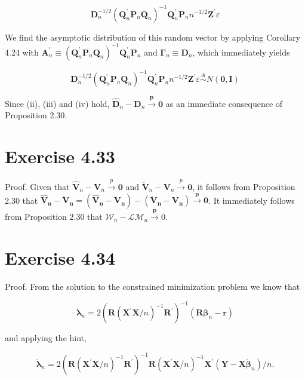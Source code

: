 \documentclass[10pt]{article}
\begin{document}
$$
\mathbf{D}_{n}^{-1 / 2}\left(\mathbf{Q}_{n}^{\prime} \mathbf{P}_{n} \mathbf{Q}_{n}\right)^{-1} \mathbf{Q}_{n}^{\prime} \mathbf{P}_{n} n^{-1 / 2} \mathbf{Z}^{\prime} \varepsilon
$$

We find the asymptotic distribution of this random vector by applying Corollary 4.24 with $\mathbf{A}_{n}^{\prime} \equiv\left(\mathbf{Q}_{n}^{\prime} \mathbf{P}_{n} \mathbf{Q}_{n}\right)^{-1} \mathbf{Q}_{n}^{\prime} \mathbf{P}_{n}$ and $\boldsymbol{\Gamma}_{n} \equiv \mathbf{D}_{n}$, which immediately yields

$$
\mathbf{D}_{n}^{-1 / 2}\left(\mathbf{Q}_{n}^{\prime} \mathbf{P}_{n} \mathbf{Q}_{n}\right)^{-1} \mathbf{Q}_{n}^{\prime} \mathbf{P}_{n} n^{-1 / 2} \mathbf{Z}^{\prime} \varepsilon \stackrel{A}{\sim} N(\mathbf{0}, \mathbf{I})
$$

Since (ii), (iii) and (iv) hold, $\hat{\mathbf{D}}_{n}-\mathbf{D}_{n} \xrightarrow{\boldsymbol{p}} \mathbf{0}$ as an immediate consequence of Proposition 2.30.

\section*{Exercise 4.33}
Proof. Given that $\hat{\mathbf{V}}_{n}-\mathbf{V}_{n} \xrightarrow{p} \mathbf{0}$ and $\ddot{\mathbf{V}}_{n}-\mathbf{V}_{n} \xrightarrow{p} \mathbf{0}$, it follows from Proposition 2.30 that $\hat{\mathbf{V}}_{\boldsymbol{n}}-\ddot{\mathbf{V}}_{\boldsymbol{n}}=\left(\hat{\mathbf{V}}_{\boldsymbol{n}}-\mathbf{V}_{\boldsymbol{n}}\right)-\left(\ddot{\mathbf{V}}_{\boldsymbol{n}}-\mathbf{V}_{\boldsymbol{n}}\right) \xrightarrow{\boldsymbol{p}} \mathbf{0}$. It immediately follows from Proposition 2.30 that $\mathcal{W}_{n}-\mathcal{L} \mathcal{M}_{n} \xrightarrow{\boldsymbol{p}} 0$.

\section*{Exercise 4.34}
Proof. From the solution to the constrained minimization problem we know that

$$
\ddot{\boldsymbol{\lambda}}_{n}=2\left(\mathbf{R}\left(\mathbf{X}^{\prime} \mathbf{X} / n\right)^{-1} \mathbf{R}^{\prime}\right)^{-1}\left(\mathbf{R} \ddot{\boldsymbol{\beta}}_{n}-\mathbf{r}\right)
$$

and applying the hint,

$$
\ddot{\boldsymbol{\lambda}}_{n}=2\left(\mathbf{R}\left(\mathbf{X}^{\prime} \mathbf{X} / n\right)^{-1} \mathbf{R}^{\prime}\right)^{-1} \mathbf{R}\left(\mathbf{X}^{\prime} \mathbf{X} / n\right)^{-1} \mathbf{X}^{\prime}\left(\mathbf{Y}-\mathbf{X} \ddot{\boldsymbol{\beta}}_{n}\right) / n .
$$
\end{document}
